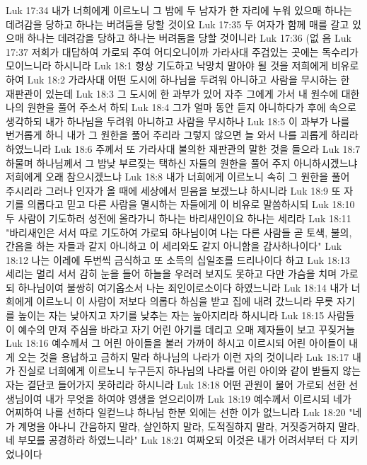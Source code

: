 Luk 17:34  내가 너희에게 이르노니 그 밤에 두 남자가 한 자리에 누워 있으매 하나는 데려감을 당하고 하나는 버려둠을 당할 것이요
Luk 17:35  두 여자가 함께 매를 갈고 있으매 하나는 데려감을 당하고 하나는 버려둠을 당할 것이니라
Luk 17:36  (없 음
Luk 17:37  저희가 대답하여 가로되 주여 어디오니이까 가라사대 주검있는 곳에는 독수리가 모이느니라 하시니라
Luk 18:1  항상 기도하고 낙망치 말아야 될 것을 저희에게 비유로 하여
Luk 18:2  가라사대 어떤 도시에 하나님을 두려워 아니하고 사람을 무시하는 한 재판관이 있는데
Luk 18:3  그 도시에 한 과부가 있어 자주 그에게 가서 내 원수에 대한 나의 원한을 풀어 주소서 하되
Luk 18:4  그가 얼마 동안 듣지 아니하다가 후에 속으로 생각하되 내가 하나님을 두려워 아니하고 사람을 무시하나
Luk 18:5  이 과부가 나를 번거롭게 하니 내가 그 원한을 풀어 주리라 그렇지 않으면 늘 와서 나를 괴롭게 하리라 하였느니라
Luk 18:6  주께서 또 가라사대 불의한 재판관의 말한 것을 들으라
Luk 18:7  하물며 하나님께서 그 밤낮 부르짖는 택하신 자들의 원한을 풀어 주지 아니하시겠느냐 저희에게 오래 참으시겠느냐
Luk 18:8  내가 너희에게 이르노니 속히 그 원한을 풀어 주시리라 그러나 인자가 올 때에 세상에서 믿음을 보겠느냐 하시니라
Luk 18:9  또 자기를 의롭다고 믿고 다른 사람을 멸시하는 자들에게 이 비유로 말씀하시되
Luk 18:10  두 사람이 기도하러 성전에 올라가니 하나는 바리새인이요 하나는 세리라
Luk 18:11  "바리새인은 서서 따로 기도하여 가로되 하나님이여 나는 다른 사람들 곧 토색, 불의, 간음을 하는 자들과 같지 아니하고 이 세리와도 같지 아니함을 감사하나이다"
Luk 18:12  나는 이레에 두번씩 금식하고 또 소득의 십일조를 드리나이다 하고
Luk 18:13  세리는 멀리 서서 감히 눈을 들어 하늘을 우러러 보지도 못하고 다만 가슴을 치며 가로되 하나님이여 불쌍히 여기옵소서 나는 죄인이로소이다 하였느니라
Luk 18:14  내가 너희에게 이르노니 이 사람이 저보다 의롭다 하심을 받고 집에 내려 갔느니라 무릇 자기를 높이는 자는 낮아지고 자기를 낮추는 자는 높아지리라 하시니라
Luk 18:15  사람들이 예수의 만져 주심을 바라고 자기 어린 아기를 데리고 오매 제자들이 보고 꾸짖거늘
Luk 18:16  예수께서 그 어린 아이들을 불러 가까이 하시고 이르시되 어린 아이들이 내게 오는 것을 용납하고 금하지 말라 하나님의 나라가 이런 자의 것이니라
Luk 18:17  내가 진실로 너희에게 이르노니 누구든지 하나님의 나라를 어린 아이와 같이 받들지 않는 자는 결단코 들어가지 못하리라 하시니라
Luk 18:18  어떤 관원이 물어 가로되 선한 선생님이여 내가 무엇을 하여야 영생을 얻으리이까
Luk 18:19  예수께서 이르시되 네가 어찌하여 나를 선하다 일컫느냐 하나님 한분 외에는 선한 이가 없느니라
Luk 18:20  "네가 계명을 아나니 간음하지 말라, 살인하지 말라, 도적질하지 말라, 거짓증거하지 말라, 네 부모를 공경하라 하였느니라"
Luk 18:21  여짜오되 이것은 내가 어려서부터 다 지키었나이다
